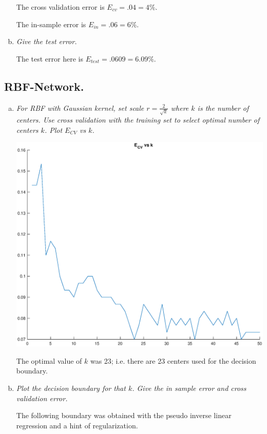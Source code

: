 \documentclass{article}
\begin{document}
\begin{enumerate}[(a)]
    The cross validation error is $E_{cv} = .04 = 4\%$.

    The in-sample error is $E_{in} = .06 = 6\%$.

  \item \textit{Give the test error.}

    The test error here is $E_{test} = .0609 = 6.09\%$.

\end{enumerate}

\subsection*{RBF-Network.}

\begin{enumerate}[(a)]
  \item \textit{For RBF with Gaussian kernel, set scale $r = \frac{2}{\sqrt{k}}$ where $k$ is the
    number of centers. Use cross validation with the training set to select optimal number of
    centers $k$. Plot $E_{CV}$ vs $k$.}

    \includegraphics[width=\textwidth]{RBF23ECV.eps}

    The optimal value of $k$ was 23; i.e. there are 23 centers used for the decision boundary.

  \item \textit{Plot the decision boundary for that $k$. Give the in sample error and cross
    validation error.}

    The following boundary was obtained with the pseudo inverse linear regression and a hint of
    regularization.


\end{enumerate}
\end{document}
